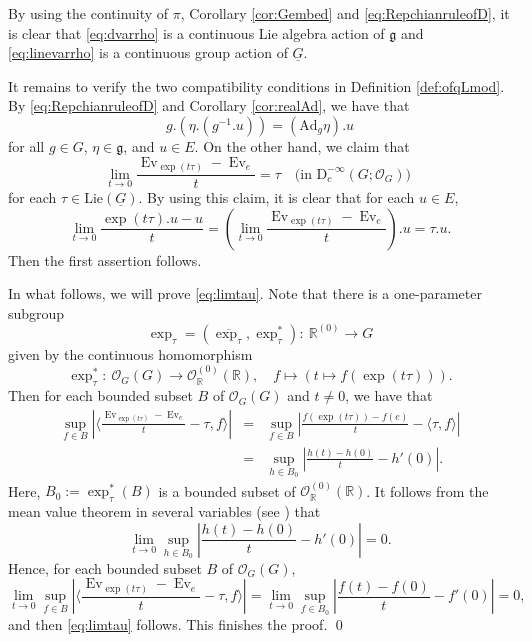 \documentclass[12pt, a4paper]{amsart}
\newcommand{\CO}{{\mathcal {O}}}
\newcommand{\RD}{{\mathrm {D}}}
\newcommand{\Ad}{{\mathrm{Ad}}}
\newcommand{\Lie}{{\mathrm{Lie}}}
\newcommand{\Ev}{\operatorname{Ev}}
\newcommand{\g}{\mathfrak g}
\newcommand{\R}{\mathbb R}
\newcommand{\la}{\langle}
\newcommand{\ra}{\rangle}
\newcommand{\be}{\begin {equation}}
\newcommand{\ee}{\end {equation}}
\theoremstyle{Theorem}
\theoremstyle{Theorem}
\theoremstyle{Theorem}
\theoremstyle{Theorem}
\theoremstyle{Plain}
\theoremstyle{remark}
\theoremstyle{remark}
\theoremstyle{Definition}
\numberwithin{equation}{section}
\begin{document}
By using the continuity of \(\pi\), Corollary \ref{cor:Gembed} and \eqref{eq:RepchianruleofD}, it is clear that \eqref{eq:dvarrho} is a continuous Lie algebra action of $\g$ and \eqref{eq:linevarrho} is a continuous group action of $\underline G$. 


It remains to verify the two compatibility conditions in Definition \ref{def:ofqLmod}.
By \eqref{eq:RepchianruleofD} and Corollary \ref{cor:realAd}, we have that 
\[g.(\eta.(g^{-1}.u))=(\Ad_g\eta).u
\]
for all \(g\in G\), \(\eta\in\g\), and \(u\in E\). On the other hand,  we claim that \be\label{eq:limtau} \lim_{t\rightarrow 0} \frac{\Ev_{\exp(t\tau)}-\Ev_{e}}{t}=\tau\quad\text{(in $\RD^{-\infty}_c(G;\CO_G)$) }\ee for each $\tau\in\Lie(\underline G)$. By using this claim, it is clear that for each $u\in E$, 
 \[\lim_{t\rightarrow 0}\frac{\exp(t\tau).u-u}{t}=(\lim_{t\rightarrow 0} \frac{\Ev_{\exp(t\tau)}-\Ev_{e}}{t}).u=\tau.u.\] Then the first assertion follows.

In what follows,  we will prove \eqref{eq:limtau}. Note that there is a one-parameter subgroup
\[ \exp_{\tau}=(\overline{\exp_{\tau}},\exp_{\tau}^*):\ \R^{(0)}\rightarrow  G\]  given by the continuous homomorphism \[\exp_{\tau}^*:\ \CO_G(G)\rightarrow \CO_{\R}^{(0)}(\R),\quad f\mapsto (t\mapsto f(\exp(t\tau))).\]
 Then for each bounded subset $B$ of $\CO_G(G)$ and $t\neq 0$, we have that  
\begin{eqnarray*}
    \sup_{f\in B} |\la \frac{\Ev_{\exp(t\tau)}-\Ev_{e}}{t}-\tau, f\ra| &=&\sup_{f\in B} |\frac{f(\exp(t\tau))-f(e)}{t}-\la \tau, f\ra|\\
    &=& \sup_{h\in B_0}  |\frac{h(t)-h(0)}{t}-h'(0)|.
\end{eqnarray*}
Here, $B_0:=\exp_{\tau}^*(B)$ is a bounded subset of  $\CO_{\R}^{(0)}(\R)$.
It follows from the mean value theorem in several variables (see \cite[Theorem 12.9]{Ap})  that 
\[\lim_{t\rightarrow 0}\sup_{h\in B_0}  |\frac{h(t)-h(0)}{t}-h'(0)|=0.\]
Hence, for each bounded subset $B$ of $\CO_G(G)$,
\[  \lim_{t\rightarrow 0}\sup_{f\in B} |\la \frac{\Ev_{\exp(t\tau)}-\Ev_{e}}{t}-\tau, f\ra|=\lim_{t\rightarrow 0}  \sup_{f\in B_0}  |\frac{f(t)-f(0)}{t}-f'(0)|=0,\] and
then \eqref{eq:limtau} follows. This finishes the proof.
\qed
\end{document}
